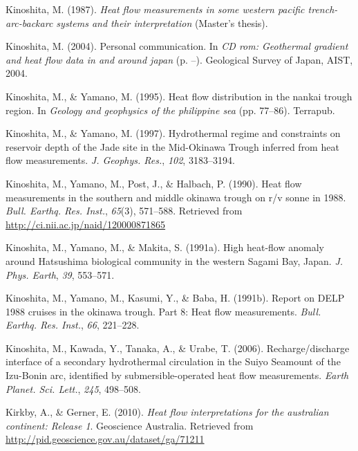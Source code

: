 \begin{CSLReferences}{1}{1}
\leavevmode{}%
Kinoshita, M. (1987). \emph{Heat flow measurements in some western pacific trench-arc-backarc systems and their interpretation} (Master's thesis).

\leavevmode{}%
Kinoshita, M. (2004). Personal communication. In \emph{CD rom: Geothermal gradient and heat flow data in and around japan} (p. --). Geological Survey of Japan, AIST, 2004.

\leavevmode{}%
Kinoshita, M., \& Yamano, M. (1995). Heat flow distribution in the nankai trough region. In \emph{Geology and geophysics of the philippine sea} (pp. 77--86). Terrapub.

\leavevmode{}%
Kinoshita, M., \& Yamano, M. (1997). Hydrothermal regime and constraints on reservoir depth of the {Jade} site in the {Mid-Okinawa Trough} inferred from heat flow measurements. \emph{J. Geophys. Res.}, \emph{102}, 3183--3194.

\leavevmode{}%
Kinoshita, M., Yamano, M., Post, J., \& Halbach, P. (1990). Heat flow measurements in the southern and middle okinawa trough on r/v sonne in 1988. \emph{Bull. Earthq. Res. Inst.}, \emph{65}(3), 571--588. Retrieved from \url{http://ci.nii.ac.jp/naid/120000871865}

\leavevmode{}%
Kinoshita, M., Yamano, M., \& Makita, S. (1991a). High heat-flow anomaly around {Hatsushima} biological community in the western {Sagami Bay, Japan}. \emph{J. Phys. Earth}, \emph{39}, 553--571.

\leavevmode{}%
Kinoshita, M., Yamano, M., Kasumi, Y., \& Baba, H. (1991b). Report on DELP 1988 cruises in the okinawa trough. Part 8: Heat flow measurements. \emph{Bull. Earthq. Res. Inst.}, \emph{66}, 221--228.

\leavevmode{}%
Kinoshita, M., Kawada, Y., Tanaka, A., \& Urabe, T. (2006). Recharge/discharge interface of a secondary hydrothermal circulation in the {Suiyo Seamount} of the {Izu-Bonin} arc, identified by submersible-operated heat flow measurements. \emph{Earth Planet. Sci. Lett.}, \emph{245}, 498--508.

\leavevmode{}%
Kirkby, A., \& Gerner, E. (2010). \emph{Heat flow interpretations for the australian continent: Release 1}. Geoscience Australia. Retrieved from \url{http://pid.geoscience.gov.au/dataset/ga/71211}


\end{CSLReferences}
